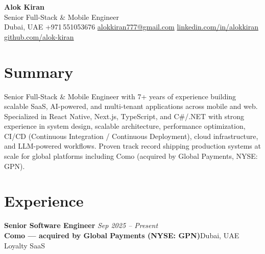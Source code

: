 \documentclass[11pt, letterpaper]{article}
\newcommand{\job}[4]{%
  \textbf{#1} \hfill \textit{#3}\\
  \textbf{#2}\quad\textbar\quad #4
}
\begin{document}
\begin{center}
  {\LARGE\bfseries Alok Kiran}\\[3pt]
  {\normalsize Senior Full-Stack \& Mobile Engineer}\\[4pt]
  {\small
    Dubai, UAE
    \textbar{} +971\,551053676
    \textbar{} \href{mailto:alokkiran777@gmail.com}{alokkiran777@gmail.com}
    \textbar{} \href{https://linkedin.com/in/alokkiran}{linkedin.com/in/alokkiran}
    \textbar{} \href{https://github.com/alok-kiran}{github.com/alok-kiran}
  }
\end{center}

\vspace{4pt}

\section{Summary}
Senior Full-Stack \& Mobile Engineer with 7+ years of experience building scalable SaaS, AI-powered,
and multi-tenant applications across mobile and web. Specialized in React Native, Next.js, TypeScript,
and C\#/.NET with strong experience in system design, scalable architecture, performance optimization,
CI/CD (Continuous Integration / Continuous Deployment), cloud infrastructure, and LLM-powered workflows. Proven track record shipping production systems
at scale for global platforms including Como (acquired by Global Payments, NYSE: GPN).

\section{Experience}

\job{Senior Software Engineer}{Como — acquired by Global Payments (NYSE: GPN)}{Sep 2025 – Present}{Dubai, UAE \textbar{} Loyalty SaaS}
\end{document}

